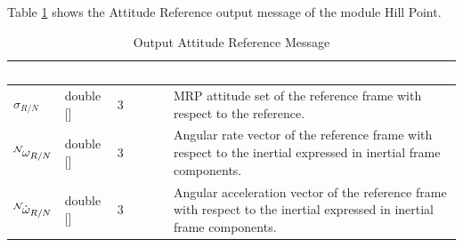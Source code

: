\documentclass[]{AVSSimReportMemo}
\begin{document}
Table \ref{tab:outputTable} shows the Attitude Reference output message of the module Hill Point.
\begin{table}[h!]
	\centering
	\caption{Output Attitude Reference Message}
	\begin{tabular}{|l|l|l|p{3in}|}
		\hline
		\rowcolor{BrickRed}
		\textcolor{white}{Name} & \textcolor{white}{Type} &
		\textcolor{white}{Length} &
		\textcolor{white}{Description}  \\ \hline
		$\sigma_{R/N}$ & double [] & 3 &
		MRP attitude set of the reference frame with respect to the reference. \\ \hline
		$\leftexp{N} \omega_{R/N}$ & double [] & 3 &
		Angular rate vector of the reference frame with respect to the inertial expressed in inertial frame components. \\ \hline
		$\leftexp{N} {\dot{\omega}_{R/N}}$ & double [] & 3 &
		Angular acceleration vector of the reference frame with respect to the inertial expressed in inertial frame components. \\ \hline
	\end{tabular}
	\label{tab:outputTable}
\end{table}
\newpage
\end{document}
